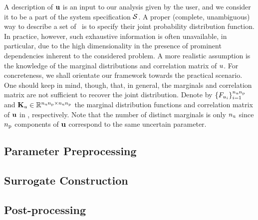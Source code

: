A description of $\mathbf{u}$ is an input to our analysis given by the user, and we consider it to be a part of the system specification $\mathcal{S}$.
A proper (complete, unambiguous) way to describe a set of \rvs\ is to specify their joint probability distribution function.
In practice, however, such exhaustive information is often unavailable, in particular, due to the high dimensionality in the presence of prominent dependencies inherent to the considered problem.
A more realistic assumption is the knowledge of the marginal distributions and correlation matrix of $u$.
For concreteness, we shall orientate our framework towards the practical scenario.
One should keep in mind, though, that, in general, the marginals and correlation matrix are not sufficient to recover the joint distribution.
Denote by $\{ F_{u_i} \}_{i = 1}^{{n_\text{u}} {n_\text{p}}}$ and $\mathbf{K}_u \in \mathbb{R}^{{n_\text{u}} {n_\text{p}} \times {n_\text{u}} {n_\text{p}}}$ the marginal distribution functions and correlation matrix of $\mathbf{u}$ in , respectively.
Note that the number of distinct marginals is only ${n_\text{u}}$ since ${n_\text{p}}$ components of $\mathbf{u}$ correspond to the same uncertain parameter.

\subsection{Parameter Preprocessing} 


\subsection{Surrogate Construction}


\subsection{Post-processing} 

